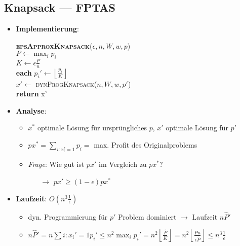 \subsection{Knapsack --- FPTAS}
\begin{itemize}
  \item \textbf{Implementierung}:
  \begin{pseudocode}
    \textsc{\textbf{epsApproxKnapsack}}($ \epsilon, n, W, w, p $) \\
    $ P \leftarrow \max_ip_i $ \\
    $ K \leftarrow \epsilon\tfrac{P}{n} $ \\
    \textbf{each} $ p_i' \leftarrow \left\lfloor \tfrac{p_i}{K} \right\rfloor $ \\
    $ x' \leftarrow $ \textsc{dynProgKnapsack}($ n, W, w, p' $) \\
    \textbf{return} x'  
  \end{pseudocode}
  \item \textbf{Analyse}:
  \begin{itemize}
    \item $ x^* $ optimale Lösung für ursprüngliches $ p $, $ x' $ optimale Lösung für $ p' $
    \item $ px^* = \sum_{i : x_i^* = 1}p_i = $ max. Profit des Originalproblems
    \item \emph{Frage}: Wie gut ist $ px' $ im Vergleich zu $ px^* $?
    \begin{itemize}
      \item[$ \to $] $ px' \geq (1-\epsilon)px^* $ 
    \end{itemize}
  \end{itemize}
  \item \textbf{Laufzeit}: $ O(n^3\tfrac{1}{\epsilon}) $
  \begin{itemize}
    \item dyn. Programmierung für $ p' $ Problem dominiert $ \to $ Laufzeit $ n\hat{P}' $
    \item $ n\hat{P}' = n\sum{i : x_i' = 1}p_i' \leq n^2\max_ip_i' = n^2\left\lfloor \tfrac{\hat{P}}{K}\right\rfloor = n^2\left\lfloor \tfrac{\hat{P}n}{\epsilon \hat{P}} \right\rfloor \leq n^3\tfrac{1}{\epsilon} $
  \end{itemize}
\end{itemize}